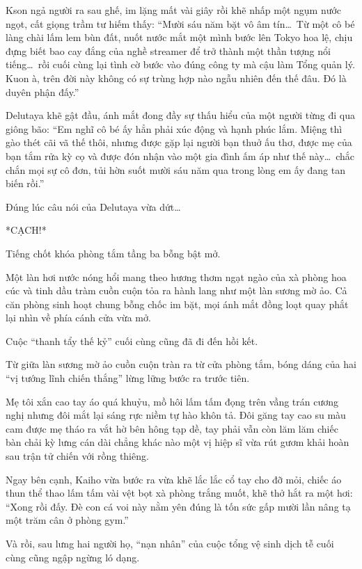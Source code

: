 \documentclass[../main.tex]{subfiles}
\begin{document}
Kson ngả người ra sau ghế, im lặng mất vài giây rồi khẽ nhấp một ngụm nước ngọt, cất giọng trầm tư hiếm thấy: ``Mười sáu năm bặt vô âm tín\dots\ Từ một cô bé làng chài lấm lem bùn đất, nuốt nước mắt một mình bước lên Tokyo hoa lệ, chịu đựng biết bao cay đắng của nghề streamer để trở thành một thần tượng nổi tiếng\dots\ rồi cuối cùng lại tình cờ bước vào đúng công ty mà cậu làm Tổng quản lý. Kuon à, trên đời này không có sự trùng hợp nào ngẫu nhiên đến thế đâu. Đó là duyên phận đấy.''

Delutaya khẽ gật đầu, ánh mắt đong đầy sự thấu hiểu của một người từng đi qua giông bão: ``Em nghĩ cô bé ấy hẳn phải xúc động và hạnh phúc lắm. Miệng thì gào thét cãi vã thế thôi, nhưng được gặp lại người bạn thuở ấu thơ, được mẹ của bạn tắm rửa kỳ cọ và được đón nhận vào một gia đình ấm áp như thế này\dots\ chắc chắn mọi sự cô đơn, tủi hờn suốt mười sáu năm qua trong lòng em ấy đang tan biến rồi.''

Đúng lúc câu nói của Delutaya vừa dứt\dots

*CẠCH!*

Tiếng chốt khóa phòng tắm tầng ba bỗng bật mở.

Một làn hơi nước nóng hổi mang theo hương thơm ngạt ngào của xà phòng hoa cúc và tinh dầu tràm cuồn cuộn tỏa ra hành lang như một làn sương mờ ảo. Cả căn phòng sinh hoạt chung bỗng chốc im bặt, mọi ánh mắt đồng loạt quay phắt lại nhìn về phía cánh cửa vừa mở.

Cuộc ``thanh tẩy thế kỷ'' cuối cùng cũng đã đi đến hồi kết.


Từ giữa làn sương mờ ảo cuồn cuộn tràn ra từ cửa phòng tắm, bóng dáng của hai ``vị tướng lĩnh chiến thắng'' lừng lững bước ra trước tiên.

Mẹ tôi xắn cao tay áo quá khuỷu, mồ hôi lấm tấm đọng trên vầng trán cương nghị nhưng đôi mắt lại sáng rực niềm tự hào khôn tả. Đôi găng tay cao su màu cam được mẹ tháo ra vắt hờ bên hông tạp dề, tay phải vẫn còn lăm lăm chiếc bàn chải kỳ lưng cán dài chẳng khác nào một vị hiệp sĩ vừa rút gươm khải hoàn sau trận tử chiến với rồng thiêng.

Ngay bên cạnh, Kaiho vừa bước ra vừa khẽ lắc lắc cổ tay cho đỡ mỏi, chiếc áo thun thể thao lấm tấm vài vệt bọt xà phòng trắng muốt, khẽ thở hắt ra một hơi: ``Xong rồi đấy. Đè con cá voi này nằm yên đúng là tốn sức gấp mười lần nâng tạ một trăm cân ở phòng gym.''

Và rồi, sau lưng hai người họ, ``nạn nhân'' của cuộc tổng vệ sinh dịch tễ cuối cùng cũng ngập ngừng ló dạng.
\end{document}
